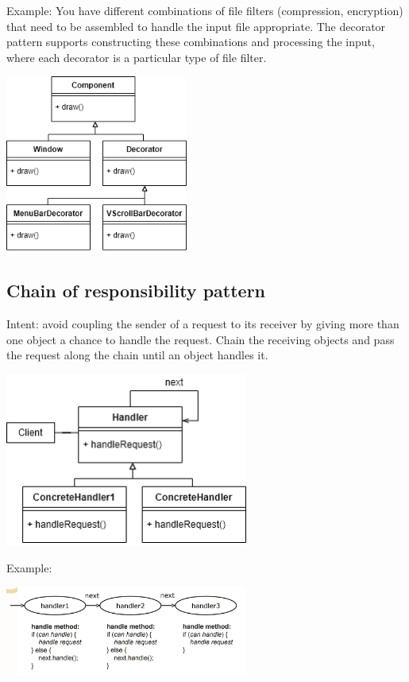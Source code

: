\documentclass[8pt, letterpaper, titlepage]{article}
\begin{document}
\begin{multicols*}{2}
    Example: You have different combinations of file filters (compression, encryption) that need to be assembled to handle the input file appropriate. The decorator pattern supports constructing these combinations and processing the input, where each decorator is a particular type of file filter.

    \includegraphics[width=6cm]{decorator.png}

    \subsection*{Chain of responsibility pattern}
    Intent: avoid coupling the sender of a request to its receiver by giving more than one object a chance to handle the request. Chain the receiving objects and pass the request along the chain until an object handles it.
    \begin{center} 
        \includegraphics[width=8cm]{respons.png}
    \end{center}
    Example:
    \begin{center} 
        \includegraphics[width=8cm]{handler.png}
    \end{center}


\end{multicols*}
\end{document}
